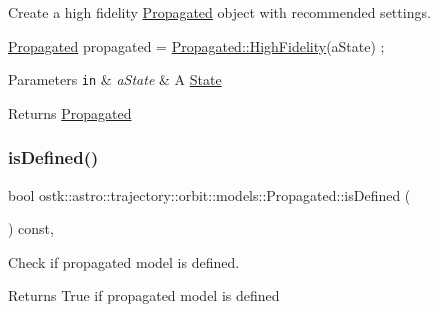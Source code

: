 Create a high fidelity \hyperlink{classostk_1_1astro_1_1trajectory_1_1orbit_1_1models_1_1_propagated}{Propagated} object with recommended settings. 


\begin{DoxyCode}
\hyperlink{classostk_1_1astro_1_1trajectory_1_1orbit_1_1models_1_1_propagated_ac45b9e7bee7892a67e6eea66561e6fe6}{Propagated} propagated = \hyperlink{classostk_1_1astro_1_1trajectory_1_1orbit_1_1models_1_1_propagated_a0cf68405428a87dabd0dd3327110cbc1}{Propagated::HighFidelity}(aState) ;
\end{DoxyCode}
 
\begin{DoxyParams}[1]{Parameters}
\mbox{\tt in}  & {\em a\+State} & A \hyperlink{classostk_1_1astro_1_1trajectory_1_1_state}{State} \\
\hline
\end{DoxyParams}
\begin{DoxyReturn}{Returns}
\hyperlink{classostk_1_1astro_1_1trajectory_1_1orbit_1_1models_1_1_propagated}{Propagated} 
\end{DoxyReturn}
\mbox{\label{classostk_1_1astro_1_1trajectory_1_1orbit_1_1models_1_1_propagated_a530fd6bc017c74dedc43ced5fe843a03}} 
\subsubsection{\texorpdfstring{is\+Defined()}{isDefined()}}
{\footnotesize\ttfamily bool ostk\+::astro\+::trajectory\+::orbit\+::models\+::\+Propagated\+::is\+Defined (\begin{DoxyParamCaption}{ }\end{DoxyParamCaption}) const\hspace{0.3cm}{\ttfamily [override]}, {\ttfamily [virtual]}}



Check if propagated model is defined. 

\begin{DoxyReturn}{Returns}
True if propagated model is defined 
\end{DoxyReturn}


